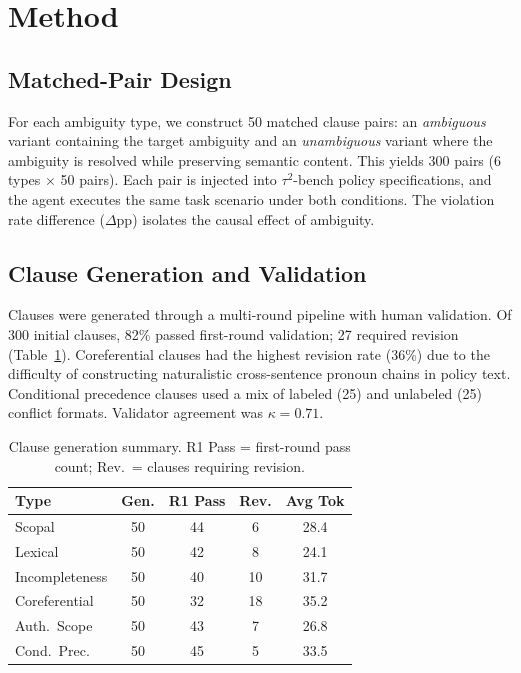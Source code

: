 \documentclass[11pt,a4paper]{article}
\begin{document}
\section{Method}

\subsection{Matched-Pair Design}

For each ambiguity type, we construct 50 matched clause pairs: an \emph{ambiguous} variant containing the target ambiguity and an \emph{unambiguous} variant where the ambiguity is resolved while preserving semantic content. This yields 300 pairs (6 types $\times$ 50 pairs). Each pair is injected into $\tau^2$-bench policy specifications, and the agent executes the same task scenario under both conditions. The violation rate difference ($\Delta$pp) isolates the causal effect of ambiguity.

\subsection{Clause Generation and Validation}

Clauses were generated through a multi-round pipeline with human validation. Of 300 initial clauses, 82\% passed first-round validation; 27 required revision (Table~\ref{tab:clause_gen}). Coreferential clauses had the highest revision rate (36\%) due to the difficulty of constructing naturalistic cross-sentence pronoun chains in policy text. Conditional precedence clauses used a mix of labeled (25) and unlabeled (25) conflict formats. Validator agreement was $\kappa = 0.71$.

\begin{table}[t]
\centering
\small
\begin{tabular}{@{}lcccc@{}}
\toprule
\textbf{Type} & \textbf{Gen.} & \textbf{R1 Pass} & \textbf{Rev.} & \textbf{Avg Tok} \\
\midrule
Scopal & 50 & 44 & 6 & 28.4 \\
Lexical & 50 & 42 & 8 & 24.1 \\
Incompleteness & 50 & 40 & 10 & 31.7 \\
Coreferential & 50 & 32 & 18 & 35.2 \\
Auth.\ Scope & 50 & 43 & 7 & 26.8 \\
Cond.\ Prec. & 50 & 45 & 5 & 33.5 \\
\bottomrule
\end{tabular}
\caption{Clause generation summary. R1 Pass = first-round pass count; Rev.\ = clauses requiring revision.}
\label{tab:clause_gen}
\end{table}
\end{document}
